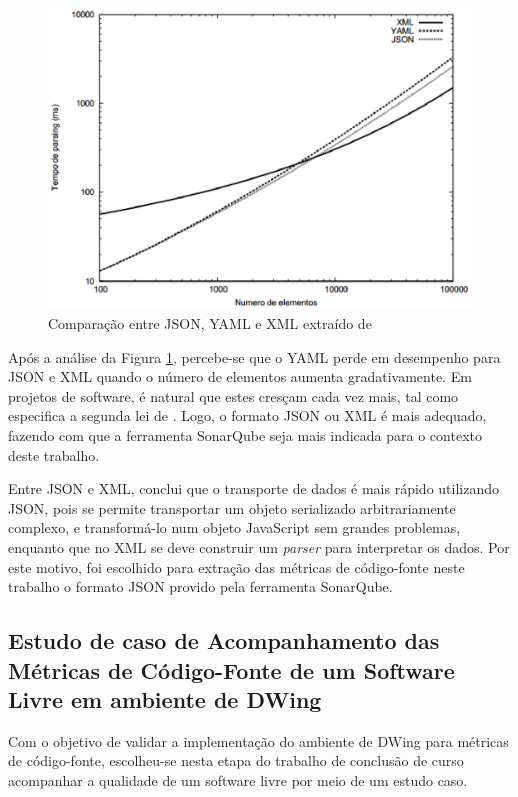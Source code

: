 \begin{figure}[ht!]
\centering
\includegraphics[keepaspectratio=false,scale=1]{figuras/json.eps}
\caption{Comparação entre JSON, YAML e XML extraído de }
\label{jsonvsyaml}
\end{figure}
\FloatBarrier

Após a análise da Figura \ref{jsonvsyaml}, percebe-se que o YAML perde em desempenho para JSON e XML quando o número de elementos aumenta gradativamente. Em projetos de software, é natural que estes cresçam cada vez mais, tal como especifica a segunda lei de . Logo, o formato JSON ou XML é mais adequado, fazendo com que a ferramenta SonarQube seja mais indicada para o contexto deste trabalho.

Entre JSON e XML,  conclui que o transporte de dados é mais rápido utilizando JSON, pois se permite transportar
um objeto serializado arbitrariamente complexo, e transformá-lo num objeto
JavaScript sem grandes problemas, enquanto que no XML se deve construir um \textit{parser} para interpretar os dados. Por este motivo, foi escolhido para extração das métricas de código-fonte neste trabalho o formato JSON provido pela ferramenta SonarQube. 


\subsection{Estudo de caso de Acompanhamento das Métricas de Código-Fonte de um Software Livre em ambiente de DWing}

Com o objetivo de validar a implementação do ambiente de DWing para métricas de código-fonte, escolheu-se nesta etapa do trabalho de conclusão de curso acompanhar a qualidade de um software livre por meio de um estudo caso.

